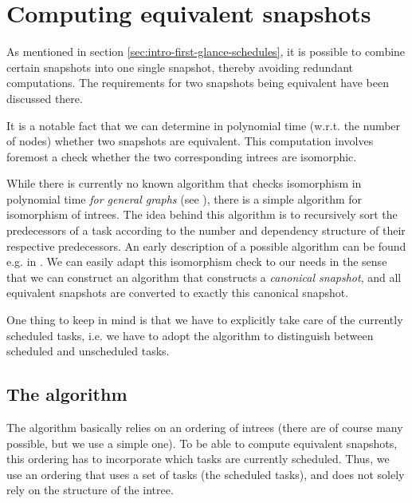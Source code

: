 \newcommand{\treegeq}[1][X]{\stackrel{\text{#1}}{\geq}}

\section{Computing equivalent snapshots}
\label{sec:algorithm-equivalent-snapshot}

As mentioned in section \ref{sec:intro-first-glance-schedules}, it is possible to combine certain snapshots into one single snapshot, thereby avoiding redundant computations. The requirements for two snapshots being equivalent have been discussed there.

It is a notable fact that we can determine in polynomial time (w.r.t. the number of nodes) whether two snapshots are equivalent. This computation involves foremost a check whether the two corresponding intrees are isomorphic. 


While there is currently no known algorithm that checks isomorphism in polynomial time \emph{for general graphs} (see \cite{arora2009computational}), there is a simple algorithm for isomorphism of intrees. The idea behind this algorithm is to recursively sort the predecessors of a task according to the number and dependency structure of their respective predecessors. An early description of a possible algorithm can be found e.g. in \cite{aho1974design}. We can easily adapt this isomorphism check to our needs in the sense that we can construct an algorithm that constructs a \emph{canonical snapshot}, and all equivalent snapshots are converted to exactly this canonical snapshot.

One thing to keep in mind is that we have to explicitly take care of the currently scheduled tasks, i.e. we have to adopt the algorithm to distinguish between scheduled and unscheduled tasks.

\subsection{The algorithm}
\label{sec:algorithm-equiv-snapshots-actual-algo}

The algorithm basically relies on an ordering of intrees (there are of course many possible, but we use a simple one). To be able to compute equivalent snapshots, this ordering has to incorporate which tasks are currently scheduled. Thus, we use an ordering that uses a set of tasks (the scheduled tasks), and does not solely rely on the structure of the intree.

